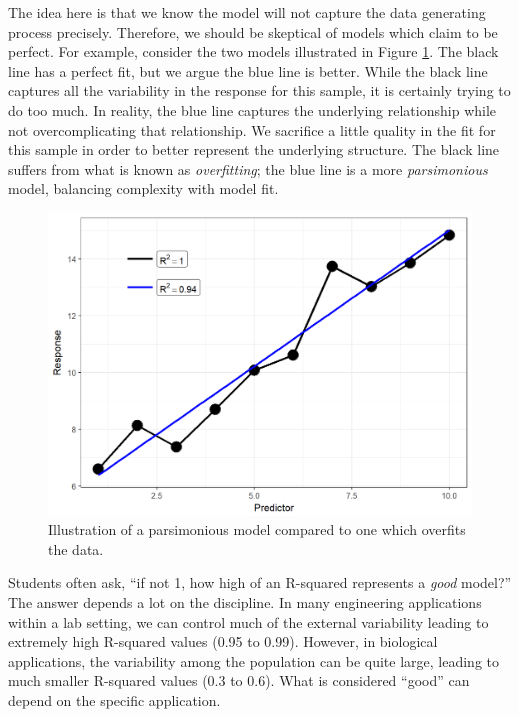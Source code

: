 \documentclass[]{book}
\theoremstyle{plain}
\theoremstyle{mydefn}
\theoremstyle{myexmpl}
\theoremstyle{remark}
\begin{document}
The idea here is that we know the model will not capture the data
generating process precisely. Therefore, we should be skeptical of
models which claim to be perfect. For example, consider the two models
illustrated in Figure \ref{fig:regquality-overfit}. The black line has a
perfect fit, but we argue the blue line is better. While the black line
captures all the variability in the response for this sample, it is
certainly trying to do too much. In reality, the blue line captures the
underlying relationship while not overcomplicating that relationship. We
sacrifice a little quality in the fit for this sample in order to better
represent the underlying structure. The black line suffers from what is
known as \emph{overfitting}; the blue line is a more \emph{parsimonious}
model, balancing complexity with model fit.

\begin{figure}

{\centering \includegraphics[width=0.8\linewidth]{./Images/regquality-overfit-1} 

}

\caption{Illustration of a parsimonious model compared to one which overfits the data.}\label{fig:regquality-overfit}
\end{figure}

Students often ask, ``if not 1, how high of an R-squared represents a
\emph{good} model?'' The answer depends a lot on the discipline. In many
engineering applications within a lab setting, we can control much of
the external variability leading to extremely high R-squared values
(0.95 to 0.99). However, in biological applications, the variability
among the population can be quite large, leading to much smaller
R-squared values (0.3 to 0.6). What is considered ``good'' can depend on
the specific application.
\end{document}
